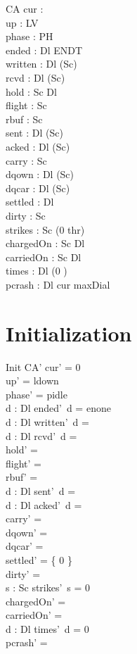 \documentclass[a4paper,10pt,fleqn]{article}
\begin{document}
\begin{schema}{CA}
  cur : \nat \\
  up : LV \\
  phase : PH \\
  ended : Dl \fun ENDT \\
  written : Dl \fun (\power Sc) \\
  rcvd : Dl \fun (\power Sc) \\
  hold : Sc \pfun Dl \\
  flight : \power Sc \\
  rbuf : \power Sc \\
  sent : Dl \fun (\power Sc) \\
  acked : Dl \fun (\power Sc) \\
  carry : \power Sc \\
  dqown : Dl \pfun (\power Sc) \\
  dqcar : Dl \pfun (\power Sc) \\
  settled : \power Dl \\
  dirty : \power Sc \\
  strikes : Sc \fun (0 \upto thr) \\
  chargedOn : Sc \rel Dl \\
  carriedOn : Sc \rel Dl \\
  times : Dl \fun (0 ) \\
  pcrash : \power Dl
\where
  cur \leq maxDial
\end{schema}

\section{Initialization}

\begin{schema}{Init}
  CA'
\where
  cur' = 0 \\
  up' = ldown \\
  phase' = pidle \\
  \forall d : Dl \spot ended'~d = enone \\
  \forall d : Dl \spot written'~d = \emptyset \\
  \forall d : Dl \spot rcvd'~d = \emptyset \\
  hold' = \emptyset \\
  flight' = \emptyset \\
  rbuf' = \emptyset \\
  \forall d : Dl \spot sent'~d = \emptyset \\
  \forall d : Dl \spot acked'~d = \emptyset \\
  carry' = \emptyset \\
  dqown' = \emptyset \\
  dqcar' = \emptyset \\
  settled' = \{ 0 \} \\
  dirty' = \emptyset \\
  \forall s : Sc \spot strikes'~s = 0 \\
  chargedOn' = \emptyset \\
  carriedOn' = \emptyset \\
  \forall d : Dl \spot times'~d = 0 \\
  pcrash' = \emptyset
\end{schema}
\end{document}
